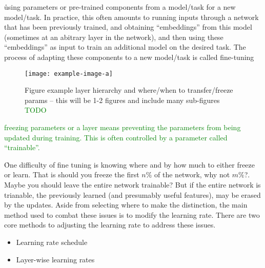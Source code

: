 \r{using parameters or pre-trained components from a model/task for a new model/task.  In practice, this often amounts to running inputs through a network that has been previously trained, and obtaining ``embeddings'' from this model (sometimes at an abitrary layer in the network), and then using these ``embeddings'' as input to train an additional model on the desired task. The process of adapting these components to a new model/task is called fine-tuning}





\begin{figure}[htp]
	\centering
	\texttt{[image: example-image-a]}\hfil
	\caption{Figure example layer hierarchy and where/when to transfer/freeze params -- this will be 1-2 figures and include many sub-figures \textcolor{green}{TODO}}
	\label{fig:transfer_learning_subfigs_a}
\end{figure}

\textcolor{green}{{freezing} parameters or a layer means preventing the parameters from being updated during training. This is often controlled by a parameter called ``trainable''.}



\r{One difficulty of fine tuning is knowing where and by how much to either freeze or learn. That is should you freeze the first $n\%$ of the network, why not $m\%$?. Maybe you should leave the entire network trainable? But if the entire network is trianable, the previously learned (and presumably useful features), may be erased by the updates. Aside from selecting where to make the distinction, the main method used to combat these issues is to modify the learning rate. There are two core methods to adjusting the learning rate to address these issues.}

\begin{itemize}[noitemsep,topsep=0pt]
	\item Learning rate schedule
	\item Layer-wise learning rates
\end{itemize}



